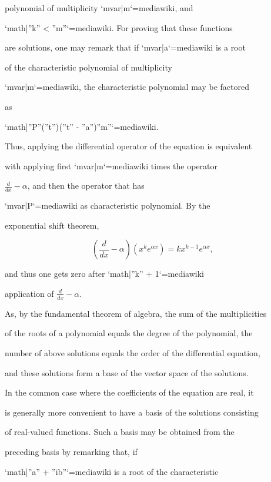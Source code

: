polynomial of multiplicity `{{mvar|m}}`{=mediawiki}, and

`{{math|''k'' < ''m''}}`{=mediawiki}. For proving that these functions

are solutions, one may remark that if `{{mvar|a}}`{=mediawiki} is a root

of the characteristic polynomial of multiplicity

`{{mvar|m}}`{=mediawiki}, the characteristic polynomial may be factored

as

`{{math|''P''(''t'') (''t'' - ''a'')''m''}}`{=mediawiki}.

Thus, applying the differential operator of the equation is equivalent

with applying first `{{mvar|m}}`{=mediawiki} times the operator

$\frac{d}{dx} - \alpha$, and then the operator that has

`{{mvar|P}}`{=mediawiki} as characteristic polynomial. By the

exponential shift theorem,



$$\left(\frac{d}{dx}-\alpha\right)\left(x^ke^{\alpha x}\right)= kx^{k-1}e^{\alpha x},$$



and thus one gets zero after `{{math|''k'' + 1}}`{=mediawiki}

application of $\frac{d}{dx} - \alpha$.



As, by the fundamental theorem of algebra, the sum of the multiplicities

of the roots of a polynomial equals the degree of the polynomial, the

number of above solutions equals the order of the differential equation,

and these solutions form a base of the vector space of the solutions.



In the common case where the coefficients of the equation are real, it

is generally more convenient to have a basis of the solutions consisting

of real-valued functions. Such a basis may be obtained from the

preceding basis by remarking that, if

`{{math|''a'' + ''ib''}}`{=mediawiki} is a root of the characteristic

